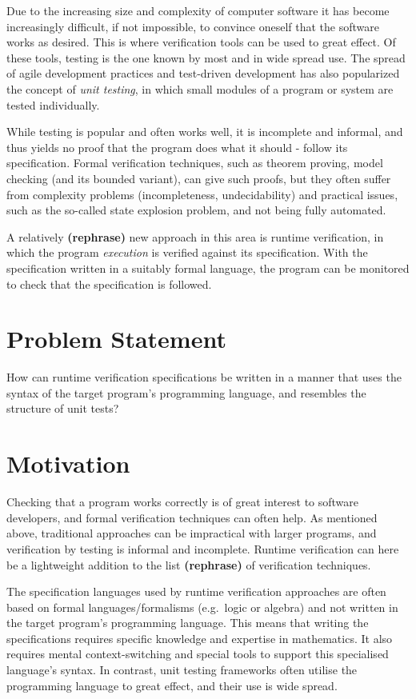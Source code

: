 \documentclass[a4paper,11pt]{kth-mag}
\newcommand{\rephrase}{\textbf{(rephrase)} }
\begin{document}
Due to the increasing size and complexity of computer software it has become
increasingly difficult, if not impossible, to convince oneself that the
software works as desired. This is where verification tools can be used to
great effect. Of these tools, testing is the one known by most and in wide
spread use.  The spread of agile development practices and test-driven
development has also popularized the concept of \textit{unit testing}, in which
small modules of a program or system are tested individually.

While testing is popular and often works well, it is incomplete and informal,
and thus yields no proof that the program does what it should - follow its
specification. Formal verification techniques, such as theorem proving, model
checking (and its bounded variant), can give such proofs, but they often suffer
from complexity problems (incompleteness, undecidability) and practical issues,
such as the so-called state explosion problem, and not being fully automated.

A relatively \rephrase new approach in this area is runtime verification, in
which the program \textit{execution} is verified against its specification.
With the specification written in a suitably formal language, the program can
be monitored to check that the specification is followed.


\section{Problem Statement} \label{section-problem-statement}

How can runtime verification specifications be written in a manner that uses
the syntax of the target program's programming language, and resembles
the structure of unit tests?

\section{Motivation}

Checking that a program works correctly is of great interest to software
developers, and formal verification techniques can often help. As mentioned
above, traditional approaches can be impractical with larger programs, and
verification by testing is informal and incomplete. Runtime verification can
here be a lightweight addition to the list \rephrase of verification
techniques.

The specification languages used by runtime verification approaches are often
based on formal languages/formalisms (e.g.\ logic or algebra) and not written in
the target program's programming language.  This means that writing the
specifications requires specific knowledge and expertise in mathematics.  It
also requires mental context-switching and special tools to support this
specialised language's syntax. In contrast, unit testing frameworks often
utilise the programming language to great effect, and their use is wide spread.
\end{document}
